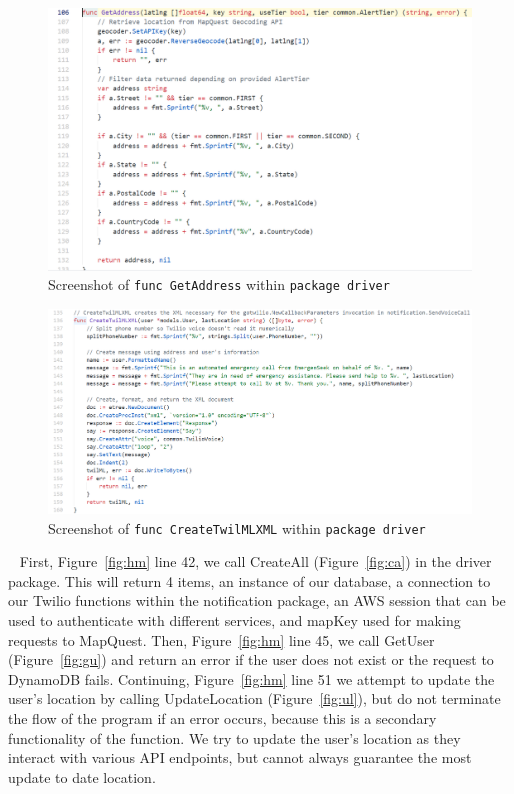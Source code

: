 \documentclass[10pt, a4paper]{article}
\begin{document}
\begin{figure}[H]
  \includegraphics[scale=.6]{code-screenshots/get-address.png}
  \caption{Screenshot of \texttt{func GetAddress} within \texttt{package driver}}\label{fig:ga}
\end{figure}

\begin{figure}[H]
  \includegraphics[scale=.6]{code-screenshots/create-twilml.png}
  \caption{Screenshot of \texttt{func CreateTwilMLXML} within \texttt{package driver}}\label{fig:ct}
\end{figure}

\par ~ First, Figure~\ref{fig:hm} line 42, we call CreateAll (Figure~\ref{fig:ca}) in the driver package. This will return 4 items, an instance of our database, a connection to our Twilio functions within the notification package, an AWS session that can be used to authenticate with different services, and mapKey used for making requests to MapQuest. Then, Figure~\ref{fig:hm} line 45, we call GetUser (Figure~\ref{fig:gu}) and return an error if the user does not exist or the request to DynamoDB fails. Continuing, Figure~\ref{fig:hm} line 51 we attempt to update the user's location by calling UpdateLocation (Figure~\ref{fig:ul}), but do not terminate the flow of the program if an error occurs, because this is a secondary functionality of the function. We try to update the user's location as they interact with various API endpoints, but cannot always guarantee the most update to date location.
\end{document}
